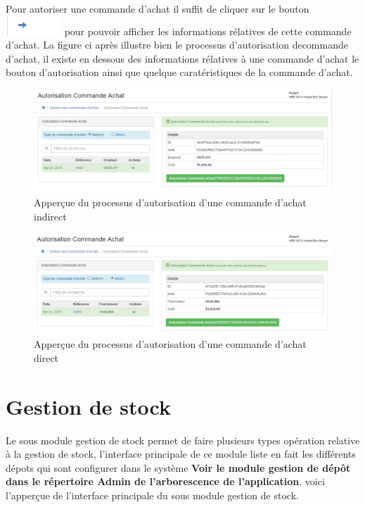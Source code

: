 \documentclass[12pt,a4paper]{report}
\begin{document}
Pour autoriser une commande d'achat il suffit de cliquer sur le bouton \includegraphics[scale=0.7]{pic/BlueArrow.png} pour pouvoir afficher les informations rélatives de cette commande d'achat. La figure ci après illustre bien le processus d'autorisation decommande d'achat, il existe en dessous des informations rélatives à une commande d'achat le bouton d'autorisation ainsi que quelque caratéristiques de la commande d'achat.

\begin{figure}[h]
\begin{center}
\includegraphics[width=12cm]{pic/AutorIndirect.png}
\end{center}
\caption{Apperçue du processus d'autorisation d'une commande d'achat indirect}
\label{Apperçue du processus d'autorisation d'une commande d'achat indirect}
\end{figure} 

\begin{figure}[h]
\begin{center}
\includegraphics[width=12cm]{pic/AutorDirect.png}
\end{center}
\caption{Apperçue du processus d'autorisation d'une commande d'achat direct}
\label{Apperçue du processus d'autorisation d'une commande d'achat direct}
\end{figure} 



\newpage
\section{Gestion de stock}
Le sous module gestion de stock permet de faire plusieurs types opération relative à la gestion de stock, l'interface principale de ce module liste en fait les différents dépots qui sont configurer dans le système \textbf{Voir le module gestion de dépôt dans le répertoire Admin de l'arborescence de l'application}. voici l'apperçue de l'interface principale du sous module gestion de stock.
\end{document}
